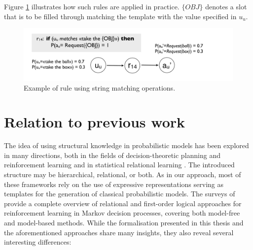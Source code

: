 Figure \ref{fig:stringmanip} illustrates how such rules are applied in practice.  $\{OBJ\}$ denotes a slot that is to be filled through matching the template with the value specified in $u_u$. 
\begin{figure}[h]
\centering
\includegraphics[scale=0.25]{imgs/stringmanip.pdf}
\caption{Example of rule using string matching operations.}
\label{fig:stringmanip}
\end{figure}

\section{Relation to previous work}
\label{sec:relatedwork}

The idea of using structural knowledge in probabilistic models has been explored in many directions, both in the fields of decision-theoretic planning and reinforcement learning \citep{Hauskrecht98,Pineau2004,KerstingR04,lang10jair,Otterlo2012} and in statistical relational learning \citep{Jaeger01,Richardson:2006,getoor:srlbook07}.  The introduced structure may be hierarchical, relational, or both. As in our approach, most of these frameworks rely on the use of expressive representations serving as templates for the generation of classical probabilistic models.  The surveys of \cite{Otterlo2006,Otterlo2012} provide a complete overview of relational and first-order logical approaches for reinforcement learning in Markov decision processes, covering both model-free and model-based methods.  While the formalisation presented in this thesis and the aforementioned approaches share many insights, they also reveal several interesting differences: 

